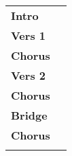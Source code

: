 
\begin{tabular}{p{1.6cm}l}
	\textbf{Intro}  & \\
	\textbf{Vers 1} & \\
	\textbf{Chorus} & \\
	\textbf{Vers 2} & \\
	\textbf{Chorus} & \\
	\textbf{Bridge} & \\
	\textbf{Chorus} & \\
	                & \\
\end{tabular}

